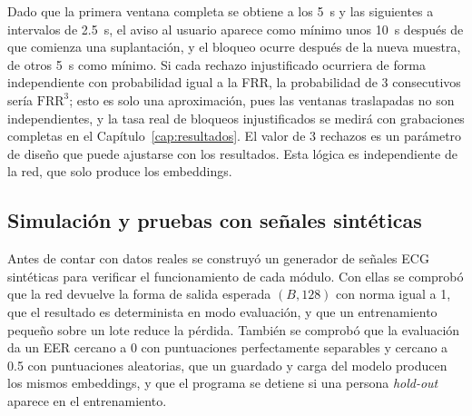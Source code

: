Dado que la primera ventana completa se obtiene a los 5~s y las siguientes a intervalos de 2.5~s, el aviso al usuario aparece como mínimo unos 10~s después de que comienza una suplantación, y el bloqueo ocurre después de la nueva muestra, de otros 5~s como mínimo. Si cada rechazo injustificado ocurriera de forma independiente con probabilidad igual a la FRR, la probabilidad de 3 consecutivos sería $\mathrm{FRR}^3$; esto es solo una aproximación, pues las ventanas traslapadas no son independientes, y la tasa real de bloqueos injustificados se medirá con grabaciones completas en el Capítulo~\ref{cap:resultados}. El valor de 3 rechazos es un parámetro de diseño que puede ajustarse con los resultados. Esta lógica es independiente de la red, que solo produce los embeddings.

\subsection{Simulación y pruebas con señales sintéticas}

Antes de contar con datos reales se construyó un generador de señales ECG sintéticas para verificar el funcionamiento de cada módulo. Con ellas se comprobó que la red devuelve la forma de salida esperada $(B, 128)$ con norma igual a 1, que el resultado es determinista en modo evaluación, y que un entrenamiento pequeño sobre un lote reduce la pérdida. También se comprobó que la evaluación da un EER cercano a 0 con puntuaciones perfectamente separables y cercano a 0.5 con puntuaciones aleatorias, que un guardado y carga del modelo producen los mismos embeddings, y que el programa se detiene si una persona \emph{hold-out} aparece en el entrenamiento.
